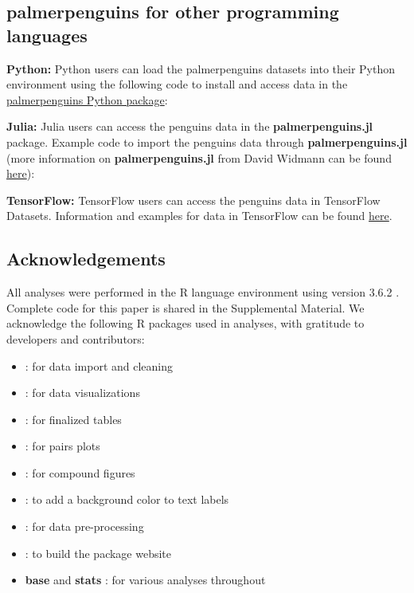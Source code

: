 \hypertarget{palmerpenguins-for-other-programming-languages}{%
\subsection{palmerpenguins for other programming
languages}\label{palmerpenguins-for-other-programming-languages}}

\textbf{Python:} Python users can load the palmerpenguins datasets into
their Python environment using the following code to install and access
data in the
\href{https://pypi.org/project/palmerpenguins/}{palmerpenguins Python
package}:

\textbf{Julia:} Julia users can access the penguins data in the
\textbf{palmerpenguins.jl} package. Example code to import the penguins
data through \textbf{palmerpenguins.jl} (more information on
\textbf{palmerpenguins.jl} from David Widmann can be found
\href{https://github.com/devmotion/palmerpenguins.jl}{here}):

\textbf{TensorFlow:} TensorFlow users can access the penguins data in
TensorFlow Datasets. Information and examples for  data
in TensorFlow can be found
\href{https://www.tensorflow.org/datasets/catalog/penguins}{here}.

\hypertarget{acknowledgements}{%
\subsection{Acknowledgements}\label{acknowledgements}}

All analyses were performed in the R language environment using version
3.6.2 \citep{r_core_team_r_2019}. Complete code for this paper is shared
in the Supplemental Material. We acknowledge the following R packages
used in analyses, with gratitude to developers and contributors:

\begin{itemize}
\tightlist
\item
   \citep{wickham_welcome_2019}: for data import and
  cleaning
\item
   \citep{wickham_ggplot2_2016}: for data
  visualizations
\item
   \citep{zhu_kableextra_2019}: for finalized tables
\item
   \citep{schloerke_ggally_2020}: for pairs plots
\item
   \citep{pedersen_patchwork_2019}: for compound
  figures
\item
   \citep{yu_shadowtext_2019}: to add a background
  color to text labels
\item
   \citep{kuhn_recipes_2020}: for data pre-processing
\item
   \citep{wickham_pkgdown_2020}: to build the package
  website
\item
  \textbf{base} and \textbf{stats} \citep{r_core_team_r_2019}: for
  various analyses throughout
\end{itemize}

